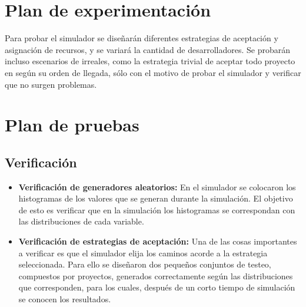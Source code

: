 \section{Plan de experimentación}
Para probar el simulador se diseñarán diferentes estrategias de aceptación y asignación de recursos, y se variará la cantidad de desarrolladores. 
Se probarán incluso escenarios de irreales, como la estrategia trivial de aceptar todo proyecto en según su orden de llegada, sólo con el motivo de probar el simulador 
y verificar que no surgen problemas.\\


\section{Plan de pruebas}

\subsection{Verificación}


\begin{itemize}
    \item \textbf{Verificación de generadores aleatorios:} En el simulador se colocaron los histogramas de los valores que se generan durante la simulación. El objetivo 
        de esto es verificar que en la simulación los histogramas se correspondan con las distribuciones de cada variable.
    \item \textbf{Verificación de estrategias de aceptación:} Una de las cosas importantes a verificar es que el simulador elija los caminos acorde a la estrategia seleccionada. 
        Para ello se diseñaron dos pequeños conjuntos de testeo, compuestos por proyectos, generados correctamente según las distribuciones que corresponden, para los cuales, 
        después de un corto tiempo de simulación se conocen los resultados.

\end{itemize}

